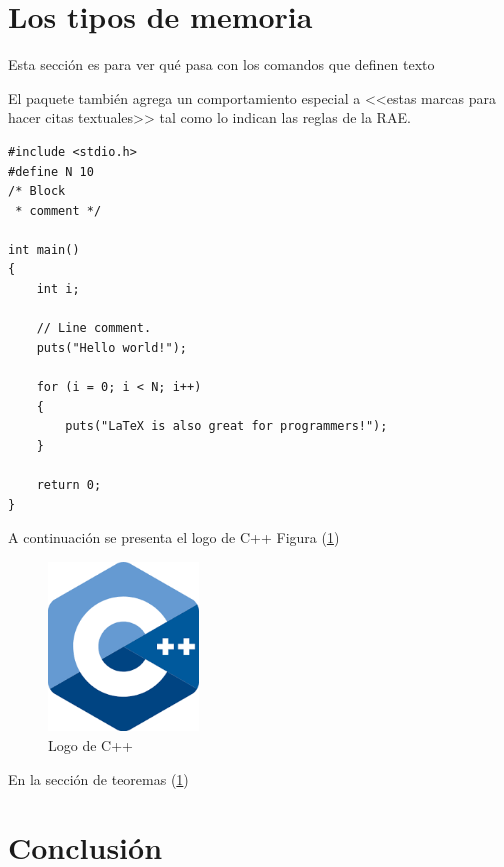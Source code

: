 \documentclass{article}
\begin{document}
 \vspace{0.4cm}

\section{Los tipos de memoria} \label{contenido}

Esta sección es para ver qué pasa con los comandos 
que definen texto

El paquete también agrega un comportamiento especial 
a <<estas marcas para hacer citas textuales>> tal como 
lo indican las reglas de la RAE. \cite{dirac}

\begin{lstlisting}
#include <stdio.h>
#define N 10
/* Block
 * comment */

int main()
{
    int i;

    // Line comment.
    puts("Hello world!");
    
    for (i = 0; i < N; i++)
    {
        puts("LaTeX is also great for programmers!");
    }

    return 0;
}
\end{lstlisting}

A continuación se presenta el logo de C++ Figura (\ref{fig:cpplogo})

\begin{figure}[h]
\includegraphics[width=4cm]{cpplogo.png}
\centering
\caption{Logo de C++}
\label{fig:cpplogo}
\end{figure}

En la sección de teoremas (\ref{contenido})

\section{Conclusión} \label{conclulsion}



\end{document}
